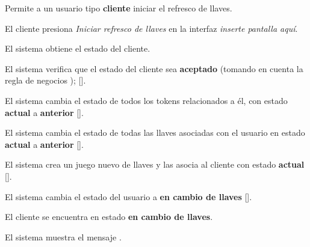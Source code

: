 %
%

{
  Permite a un usuario tipo \textbf{cliente} iniciar el refresco de llaves.

  \begin{trayectoriaPrincipal}

    \item El cliente presiona \textit{Iniciar refresco de llaves} en la interfaz
      \textit{inserte pantalla aquí}.

    \item El sistema obtiene el estado del cliente.

    \item El sistema verifica que el estado del cliente sea
      \textbf{aceptado} (tomando en cuenta la regla de negocios
      );
      [].

    \item El sistema cambia el estado de todos los tokens relacionados a él, con
      estado \textbf{actual} a \textbf{anterior}
      [].

    \item El sistema cambia el estado de todas las llaves asociadas con el
      usuario en estado \textbf{actual} a \textbf{anterior}
      [].

    \item El sistema crea un juego nuevo de llaves y las asocia al cliente
      con estado \textbf{actual} [].

    \item El sistema cambia el estado del usuario a
      \textbf{en cambio de llaves}
      [].

  \end{trayectoriaPrincipal}

  \begin{trayectoriaAlternativa}
    {El cliente se encuentra en estado \textbf{en cambio de llaves}.}

    \item El sistema muestra el mensaje
      .

  \end{trayectoriaAlternativa}

}
